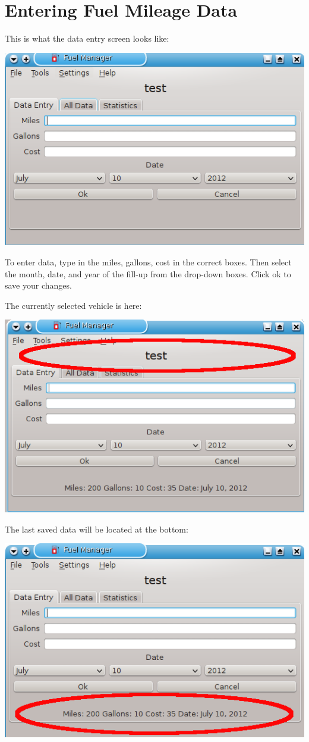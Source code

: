 \chapter{Entering Fuel Mileage Data}
This is what the data entry screen looks like:
  \begin{center}
    \includegraphics{snapshot6}
  \end{center}
To enter data, type in the miles, gallons, cost in the correct boxes.
Then select the month, date, and year of the fill-up from the drop-down boxes.
Click ok to save your changes.

The currently selected vehicle is here:
  \begin{center}
    \includegraphics{snapshot6a}
  \end{center}

The last saved data will be located at the bottom:
  \begin{center}
    \includegraphics{snapshot6b}
  \end{center}

